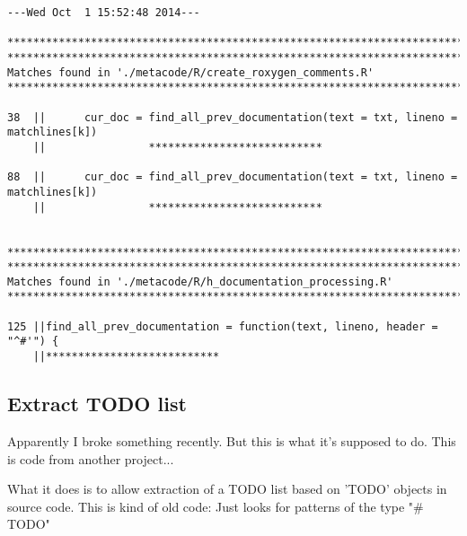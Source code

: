 \documentclass[11pt]{article}
\begin{document}
\begin{verbatim}
---Wed Oct  1 15:52:48 2014---

*******************************************************************************
*******************************************************************************
Matches found in './metacode/R/create_roxygen_comments.R'
*******************************************************************************

38  ||      cur_doc = find_all_prev_documentation(text = txt, lineno = matchlines[k])
    ||                ***************************

88  ||      cur_doc = find_all_prev_documentation(text = txt, lineno = matchlines[k])
    ||                ***************************


*******************************************************************************
*******************************************************************************
Matches found in './metacode/R/h_documentation_processing.R'
*******************************************************************************

125 ||find_all_prev_documentation = function(text, lineno, header = "^#'") {
    ||***************************

\end{verbatim}

\pagebreak

\subsection{Extract TODO list}
Apparently I broke something recently. But this is what it's supposed to do. This is code from another project... 

What it does is to allow extraction of a TODO list based on 'TODO' objects in source code. This is kind of old code: Just looks for patterns of the type "# TODO"
\end{document}
